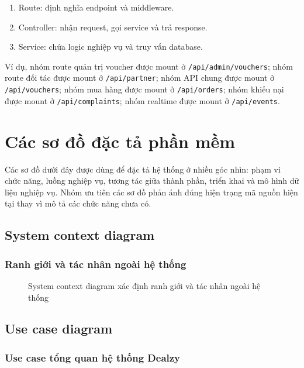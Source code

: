 \begin{enumerate}[leftmargin=1.2cm]
    \item Route: định nghĩa endpoint và middleware.
    \item Controller: nhận request, gọi service và trả response.
    \item Service: chứa logic nghiệp vụ và truy vấn database.
\end{enumerate}

Ví dụ, nhóm route quản trị voucher được mount ở \texttt{/api/admin/vouchers}; nhóm route đối tác được mount ở \texttt{/api/partner}; nhóm API chung được mount ở \texttt{/api/vouchers}; nhóm mua hàng được mount ở \texttt{/api/orders}; nhóm khiếu nại được mount ở \texttt{/api/complaints}; nhóm realtime được mount ở \texttt{/api/events}.

\section{Các sơ đồ đặc tả phần mềm}

Các sơ đồ dưới đây được dùng để đặc tả hệ thống ở nhiều góc nhìn: phạm vi chức năng, luồng nghiệp vụ, tương tác giữa thành phần, triển khai và mô hình dữ liệu nghiệp vụ. Nhóm ưu tiên các sơ đồ phản ánh đúng hiện trạng mã nguồn hiện tại thay vì mô tả các chức năng chưa có.

\subsection{System context diagram}

\subsubsection{Ranh giới và tác nhân ngoài hệ thống}

\begin{figure}[H]
\centering
{}
\caption{System context diagram xác định ranh giới và tác nhân ngoài hệ thống}
\end{figure}

\subsection{Use case diagram}

\subsubsection{Use case tổng quan hệ thống Dealzy}


